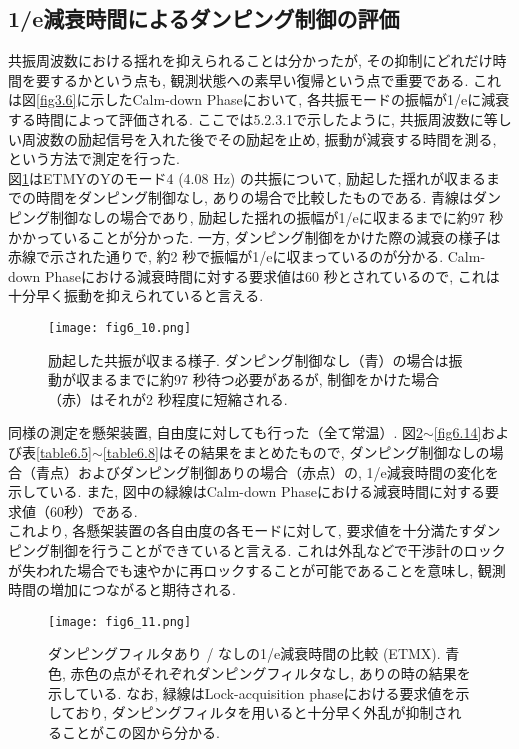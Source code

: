 \subsection{1/e減衰時間によるダンピング制御の評価}
共振周波数における揺れを抑えられることは分かったが, その抑制にどれだけ時間を要するかという点も, 観測状態への素早い復帰という点で重要である. これは図\ref{fig3.6}に示したCalm-down Phaseにおいて, 各共振モードの振幅が1/eに減衰する時間によって評価される. ここでは5.2.3.1で示したように, 共振周波数に等しい周波数の励起信号を入れた後でその励起を止め, 振動が減衰する時間を測る, という方法で測定を行った. \\
\quad 図\ref{fig6.10}はETMYのYのモード4 (4.08 Hz) の共振について, 励起した揺れが収まるまでの時間をダンピング制御なし, ありの場合で比較したものである. 青線はダンピング制御なしの場合であり, 励起した揺れの振幅が1/eに収まるまでに約97 秒かかっていることが分かった. 一方, ダンピング制御をかけた際の減衰の様子は赤線で示された通りで, 約2 秒で振幅が1/eに収まっているのが分かる. Calm-down Phaseにおける減衰時間に対する要求値は60 秒とされているので, これは十分早く振動を抑えられていると言える. 
\begin{figure}[H]
\begin{center}
\texttt{[image: fig6\_10.png]}
\caption[励起した共振が収まる様子]{励起した共振が収まる様子. ダンピング制御なし（青）の場合は振動が収まるまでに約97 秒待つ必要があるが, 制御をかけた場合（赤）はそれが2 秒程度に短縮される. }
\label{fig6.10}
\end{center}
\end{figure}
\quad 同様の測定を懸架装置, 自由度に対しても行った（全て常温）. 図\ref{fig6.11}$\sim$\ref{fig6.14}および表\ref{table6.5}$\sim$\ref{table6.8}はその結果をまとめたもので, ダンピング制御なしの場合（青点）およびダンピング制御ありの場合（赤点）の, 1/e減衰時間の変化を示している. また, 図中の緑線はCalm-down Phaseにおける減衰時間に対する要求値（60秒）である. \\
\quad これより, 各懸架装置の各自由度の各モードに対して, 要求値を十分満たすダンピング制御を行うことができていると言える. これは外乱などで干渉計のロックが失われた場合でも速やかに再ロックすることが可能であることを意味し, 観測時間の増加につながると期待される. 
\begin{figure}[H]
\begin{center}
\texttt{[image: fig6\_11.png]}
\caption[1/e減衰時間 (ETMX)]{ダンピングフィルタあり / なしの1/e減衰時間の比較 (ETMX). 青色, 赤色の点がそれぞれダンピングフィルタなし, ありの時の結果を示している. なお, 緑線はLock-acquisition phaseにおける要求値を示しており, ダンピングフィルタを用いると十分早く外乱が抑制されることがこの図から分かる. }
\label{fig6.11}
\end{center}
\end{figure}
